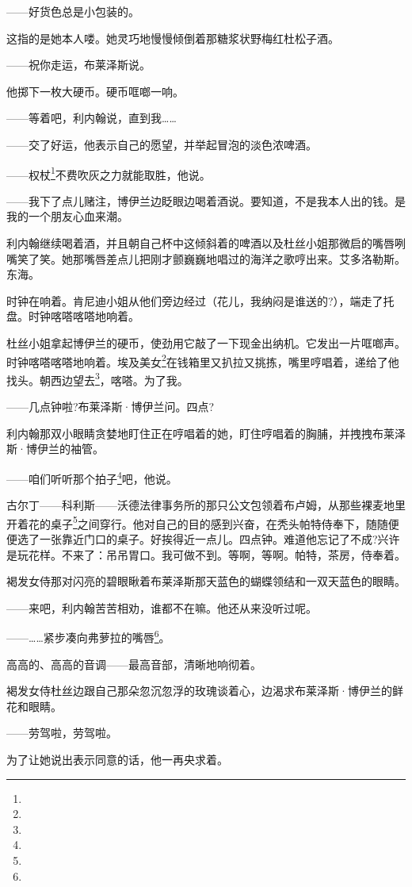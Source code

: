 \par ——好货色总是小包装的。
\par 这指的是她本人喽。她灵巧地慢慢倾倒着那糖浆状野梅红杜松子酒。
\par ——祝你走运，布莱泽斯说。
\par 他掷下一枚大硬币。硬币哐啷一响。
\par ——等着吧，利内翰说，直到我……
\par ——交了好运，他表示自己的愿望，并举起冒泡的淡色浓啤酒。
\par ——权杖\footnote{}不费吹灰之力就能取胜，他说。
\par ——我下了点儿赌注，博伊兰边眨眼边喝着酒说。要知道，不是我本人出的钱。是我的一个朋友心血来潮。
\par 利内翰继续喝着酒，并且朝自己杯中这倾斜着的啤酒以及杜丝小姐那微启的嘴唇咧嘴笑了笑。她那嘴唇差点儿把刚才颤巍巍地唱过的海洋之歌哼出来。艾多洛勒斯。东海。
\par 时钟在响着。肯尼迪小姐从他们旁边经过（花儿，我纳闷是谁送的?），端走了托盘。时钟喀嗒喀嗒地响着。
\par 杜丝小姐拿起博伊兰的硬币，使劲用它敲了一下现金出纳机。它发出一片哐啷声。时钟喀嗒喀嗒地响着。埃及美女\footnote{}在钱箱里又扒拉又挑拣，嘴里哼唱着，递给了他找头。朝西边望去\footnote{}，喀嗒。为了我。
\par ——几点钟啦?布莱泽斯·博伊兰问。四点?
\par 利内翰那双小眼睛贪婪地盯住正在哼唱着的她，盯住哼唱着的胸脯，并拽拽布莱泽斯·博伊兰的袖管。
\par ——咱们听听那个拍子\footnote{}吧，他说。
\par 古尔丁——科利斯——沃德法律事务所的那只公文包领着布卢姆，从那些裸麦地里开着花的桌子\footnote{}之间穿行。他对自己的目的感到兴奋，在秃头帕特侍奉下，随随便便选了一张靠近门口的桌子。好挨得近一点儿。四点钟。难道他忘记了不成?兴许是玩花样。不来了：吊吊胃口。我可做不到。等啊，等啊。帕特，茶房，侍奉着。
\par 褐发女侍那对闪亮的碧眼瞅着布莱泽斯那天蓝色的蝴蝶领结和一双天蓝色的眼睛。
\par ——来吧，利内翰苦苦相劝，谁都不在嘛。他还从来没听过呢。
\par ——……紧步凑向弗萝拉的嘴唇\footnote{}。
\par 高高的、高高的音调——最高音部，清晰地响彻着。
\par 褐发女侍杜丝边跟自己那朵忽沉忽浮的玫瑰谈着心，边渴求布莱泽斯·博伊兰的鲜花和眼睛。
\par ——劳驾啦，劳驾啦。
\par 为了让她说出表示同意的话，他一再央求着。
